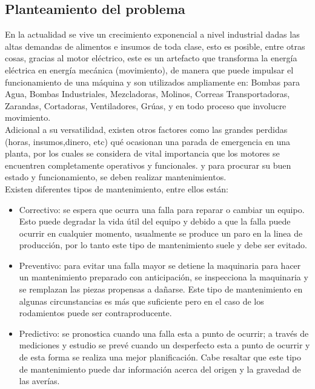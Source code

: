 \setcounter{page}{1}

\begin{center}
	\section{Planteamiento del problema}
\end{center}



	En la actualidad se vive un crecimiento exponencial a nivel industrial dadas las altas demandas de alimentos e insumos de toda clase, esto es posible, entre otras cosas, gracias al motor eléctrico, este es un artefacto que transforma la energía eléctrica en energía mecánica (movimiento), de manera que puede impulsar el funcionamiento de una máquina y son utilizados ampliamente en: Bombas para Agua, Bombas Industriales, Mezcladoras, Molinos, Correas Transportadoras, Zarandas, Cortadoras, Ventiladores, Grúas, y en todo proceso que involucre movimiento.\\
	Adicional a su versatilidad, existen otros factores como las grandes perdidas (horas, insumos,dinero, etc) qué ocasionan una parada de emergencia en una planta, por los cuales se considera de vital importancia que los motores se encuentren completamente operativos y funcionales. y para procurar su buen estado y funcionamiento, se deben realizar mantenimientos.\\



	Existen diferentes tipos de mantenimiento, entre ellos están: 
	\begin{itemize}
		\item Correctivo: se espera que ocurra una falla para
	reparar o cambiar un equipo. Esto puede degradar la vida útil del equipo y debido a que la falla puede ocurrir en cualquier momento, usualmente se produce un paro en la linea de producción, por lo tanto este tipo de mantenimiento suele y debe ser evitado.

		\item Preventivo: para evitar una falla mayor se detiene la maquinaria para hacer un mantenimiento preparado con anticipación, se inspecciona la maquinaria y se remplazan las piezas propensas a dañarse. Este tipo de mantenimiento en algunas circunstancias es más que suficiente pero en el caso de los rodamientos puede ser contraproducente.

		\item Predictivo: se pronostica cuando una falla esta a punto de ocurrir; a través de mediciones y estudio se prevé cuando un desperfecto esta a punto de ocurrir y de esta forma se realiza una mejor planificación. Cabe resaltar que este tipo de mantenimiento puede dar información acerca del origen y la gravedad de las averías.
	\end{itemize}

